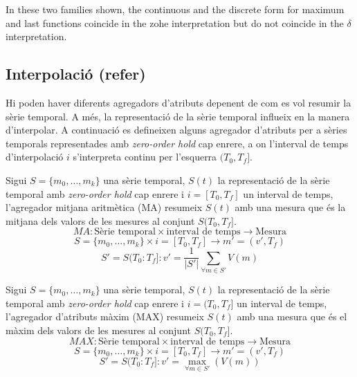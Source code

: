 In these two families shown, the continuous and the discrete form for
maximum and last functions coincide in the zohe interpretation but do
not coincide in the $\delta$ interpretation. 









\subsection{Interpolació (refer)}



Hi poden haver diferents agregadors d'atributs depenent de com es vol resumir la sèrie temporal. A més, la representació de la sèrie temporal influeix en la manera d'interpolar. A continuació es defineixen alguns agregador d'atributs per a sèries temporals representades amb  \emph{zero-order hold} cap enrere, a on l'interval de temps d'interpolació $i$ s'interpreta continu per l'esquerra $(T_0,T_f]$. 





\begin{definition}
  Sigui $S=\{m_0,\ldots,m_k\}$ una sèrie temporal, $S(t)$ la
  representació de la sèrie temporal amb \emph{zero-order hold} cap
  enrere i $i=[T_0,T_f]$ un interval de temps, l'agregador mitjana
  aritmètica (MA) resumeix $S(t)$ amb una mesura que és la mitjana dels
  valors de les mesures al conjunt $S(T_0,T_f]$.
\[
MA: \text{Sèrie temporal} \times \text{interval de temps}
\longrightarrow \text{Mesura}
\]
\[
S=\{m_0,\ldots,m_k\} \times i=[T_0,T_f] \longrightarrow m'=(v',T_f)
\]
\[
S'=S(T_0:T_f]:
v' = \frac{1}{|S'|} \sum\limits_{\forall m\in S'} V(m)
\]
\end{definition}

\begin{definition}
  Sigui $S=\{m_0,\ldots,m_k\}$ una sèrie temporal, $S(t)$ la
  representació de la sèrie temporal amb \emph{zero-order hold} cap
  enrere i $i=(T_0,T_f]$ un interval de temps, l'agregador d'atributs màxim
  (MAX) resumeix $S(t)$ amb una mesura que és el màxim dels valors
  de les mesures al conjunt $S(T_0,T_f]$.
\[
MAX: \text{Sèrie temporal} \times \text{interval de temps} \longrightarrow \text{Mesura}
\]
\[
S=\{m_0,\ldots,m_k\} \times i=[T_0,T_f]  \longrightarrow m'=(v',T_f)
\]
\[
S'=S(T_0:T_f]:
v' = \max_{\forall m \in S'}(V(m))
\]
\end{definition}

